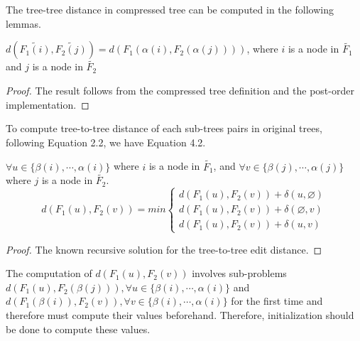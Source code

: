 The tree-tree distance in compressed tree can be computed in the following lemmas.

\begin{lemma}
$d(\widetilde{F_1(i)}, \widetilde{F_2(j)}) = d(F_1(\alpha(i), F_2(\alpha(j))))$, where $i$ is a node in $\widetilde{F_1}$ and $j$ is a node in $\widetilde{F_2}$
\end{lemma}
\begin{proof}
The result follows from the compressed tree definition and the post-order implementation.
\end{proof}

To compute tree-to-tree distance of each sub-trees pairs in original trees, following Equation 2.2, we have Equation 4.2.

\begin{lemma}
$\forall u \in \{\beta(i), \cdots, \alpha(i)\}$ where $i$ is a node in $\widetilde{F_1}$, and $\forall v \in \{\beta(j), \cdots, \alpha(j)\}$ where $j$ is a node in $\widetilde{F_2}$.
\begin{equation}
d(F_1(u), F_2(v)) = min\begin{cases}
d(F_1^{\comp}(u), F_2(v)) + \delta(u, \varnothing)\\
d(F_1(u), F_2^{\comp}(v)) + \delta(\varnothing, v)\\
d(F_1^{\comp}(u), F_2^{\comp}(v)) + \delta(u, v)
\end{cases}
\end{equation}
\end{lemma}
\begin{proof}
The known recursive solution for the tree-to-tree edit distance.
\end{proof}

The computation of $d(F_1(u), F_2(v))$ involves sub-problems $d(F_1(u), F_2^{\comp}(\beta(j))), \forall u \in \{\beta(i), \cdots, \alpha(i)\}$ and $d(F_1^{\comp}(\beta(i)), F_2(v)), \forall v \in \{\beta(i), \cdots, \alpha(i)\}$ for the first time and therefore must compute their values beforehand. Therefore, initialization should be done to compute these values.  


